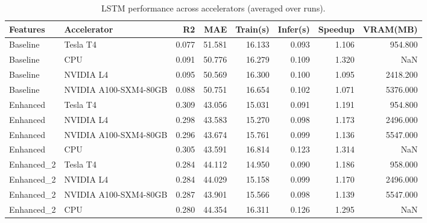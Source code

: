 \begin{table}
\caption{LSTM performance across accelerators (averaged over runs).}
\label{tab:lstm_accel}
\begin{tabular}{llrrrrrr}
\toprule
Features & Accelerator & R2 & MAE & Train(s) & Infer(s) & Speedup & VRAM(MB) \\
\midrule
Baseline & Tesla T4 & 0.077 & 51.581 & 16.133 & 0.093 & 1.106 & 954.800 \\
Baseline & CPU & 0.091 & 50.776 & 16.279 & 0.109 & 1.320 & NaN \\
Baseline & NVIDIA L4 & 0.095 & 50.569 & 16.300 & 0.100 & 1.095 & 2418.200 \\
Baseline & NVIDIA A100-SXM4-80GB & 0.088 & 50.751 & 16.654 & 0.102 & 1.071 & 5376.000 \\
Enhanced & Tesla T4 & 0.309 & 43.056 & 15.031 & 0.091 & 1.191 & 954.800 \\
Enhanced & NVIDIA L4 & 0.298 & 43.583 & 15.270 & 0.098 & 1.173 & 2496.000 \\
Enhanced & NVIDIA A100-SXM4-80GB & 0.296 & 43.674 & 15.761 & 0.099 & 1.136 & 5547.000 \\
Enhanced & CPU & 0.305 & 43.591 & 16.814 & 0.123 & 1.314 & NaN \\
Enhanced\_2 & Tesla T4 & 0.284 & 44.112 & 14.950 & 0.090 & 1.186 & 958.000 \\
Enhanced\_2 & NVIDIA L4 & 0.284 & 44.029 & 15.158 & 0.099 & 1.170 & 2496.000 \\
Enhanced\_2 & NVIDIA A100-SXM4-80GB & 0.287 & 43.901 & 15.566 & 0.098 & 1.139 & 5547.000 \\
Enhanced\_2 & CPU & 0.280 & 44.354 & 16.311 & 0.126 & 1.295 & NaN \\
\bottomrule
\end{tabular}
\end{table}
